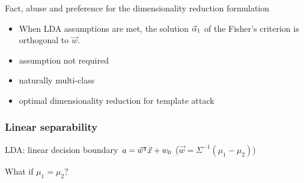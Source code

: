 \begin{frame}
\begin{block}{Fact, abuse and preference for the dimensionality reduction formulation}
\begin{itemize}
\item When LDA assumptions are met, the solution $\vec{\alpha}_1$ of the Fisher's criterion is orthogonal to $\vec{w}$. 
\item assumption not required
\item naturally multi-class
\item optimal dimensionality reduction for template attack
\end{itemize}
\end{block}

\end{frame}

\begin{frame}
\frametitle{Linear separability}

LDA: linear decision boundary $a = \vec{w}^\intercal \vec{x} + w_0$ ($\vec{w} = \Sigma^{-1}(\mu_1-\mu_2)$)
%
\begin{block}{}
\begin{huge}
\centering What if $\mu_1 = \mu_2$? 
\end{huge}
\end{block}
\end{frame}
